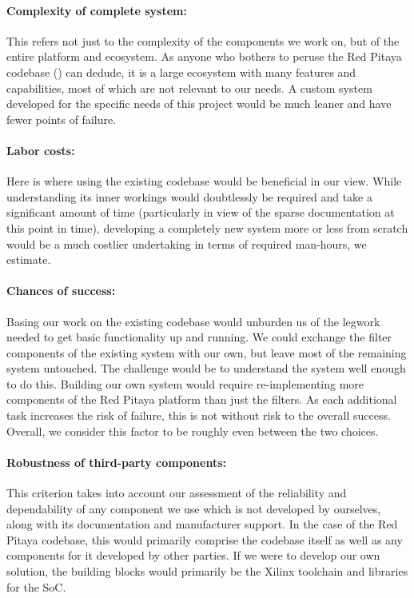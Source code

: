 \paragraph{Complexity  of  complete  system:} This  refers  not  just  to  the
complexity  of  the  components  we  work  on,  but  of  the  entire  platform
and  ecosystem. As  anyone who  bothers  to  peruse  the Red  Pitaya  codebase
(\cite{pita:github}) can  dedude, it is  a large ecosystem with  many features
and capabilities, most of which are not relevant to our needs. A custom system
developed for the specific needs of this project would be much leaner and have
fewer points of failure.

\paragraph{Labor  costs:} Here  is where  using  the  existing codebase  would
be  beneficial  in our  view. While  understanding  its inner  workings  would
doubtlessly be required and take a significant amount of time (particularly in
view  of  the sparse  documentation  at  this  point  in time),  developing  a
completely  new system  more or  less from  scratch would  be a  much costlier
undertaking in terms of required man-hours, we estimate.

\paragraph{Chances of success:} Basing our work on the existing codebase would
unburden  us  of  the  legwork  needed  to  get  basic  functionality  up  and
running. We could exchange  the filter components of the  existing system with
our own, but leave most of the remaining system untouched. The challenge would
be to understand the  system well enough to do this.   Building our own system
would require re-implementing more components  of the Red Pitaya platform than
just the filters. As each additional task  increases the risk of failure, this
is not without  risk to the overall success. Overall, we  consider this factor
to be roughly even between the two choices.

\paragraph{Robustness  of third-party  components:} This criterion  takes into
account our assessment  of the reliability and dependability  of any component
we use which  is not developed by ourselves, along  with its documentation and
manufacturer  support. In the  case of  the  Red Pitaya  codebase, this  would
primarily  comprise the  codebase  itself as  well as  any  components for  it
developed  by other  parties. If  we were  to develop  our  own solution,  the
building blocks would primarily be the  Xilinx toolchain and libraries for the
SoC.

